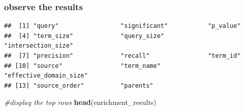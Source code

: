 \documentclass[
]{book}
\newenvironment{Shaded}{\begin{snugshade}}{\end{snugshade}}
\newcommand{\CommentTok}[1]{\textcolor[rgb]{0.56,0.35,0.01}{\textit{#1}}}
\newcommand{\FunctionTok}[1]{\textcolor[rgb]{0.13,0.29,0.53}{\textbf{#1}}}
\newcommand{\NormalTok}[1]{#1}
\newcommand{\OtherTok}[1]{\textcolor[rgb]{0.56,0.35,0.01}{#1}}
\newcommand{\SpecialCharTok}[1]{\textcolor[rgb]{0.81,0.36,0.00}{\textbf{#1}}}
\begin{document}
\subsubsection{observe the results}\label{observe-the-results}

\begin{Shaded}
\end{Shaded}

\begin{verbatim}
##  [1] "query"                 "significant"           "p_value"              
##  [4] "term_size"             "query_size"            "intersection_size"    
##  [7] "precision"             "recall"                "term_id"              
## [10] "source"                "term_name"             "effective_domain_size"
## [13] "source_order"          "parents"
\end{verbatim}

\begin{Shaded}
\begin{Highlighting}[]
\CommentTok{\#display the top rows}
\FunctionTok{head}\NormalTok{(enrichment\_results)}
\end{Highlighting}
\end{Shaded}
\end{document}
